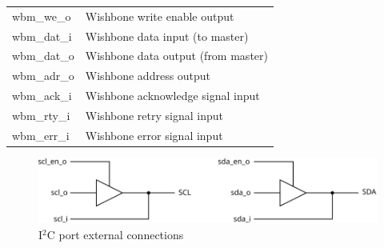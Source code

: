 \documentclass[a4paper,11pt]{article}
\begin{document}
\begin{table}[hbtp]
{\begin{tabular}{l p{}}
    wbm\_we\_o   & Wishbone write enable output \\
    wbm\_dat\_i  & Wishbone data input (to master) \\
    wbm\_dat\_o  & Wishbone data output (from master) \\
    wbm\_adr\_o  & Wishbone address output \\
    wbm\_ack\_i  & Wishbone acknowledge signal input \\
    wbm\_rty\_i  & Wishbone retry signal input \\
    wbm\_err\_i  & Wishbone error signal input \\
    \hline
    \end{tabular}
  }
\end{table}

\begin{figure}[h]
  \centerline{\includegraphics[width=.75\textwidth]{fig/i2c-ports}}
  \caption{I$^2$C port external connections}
  \label{fig:i2c-ports}
\end{figure}
\end{document}

